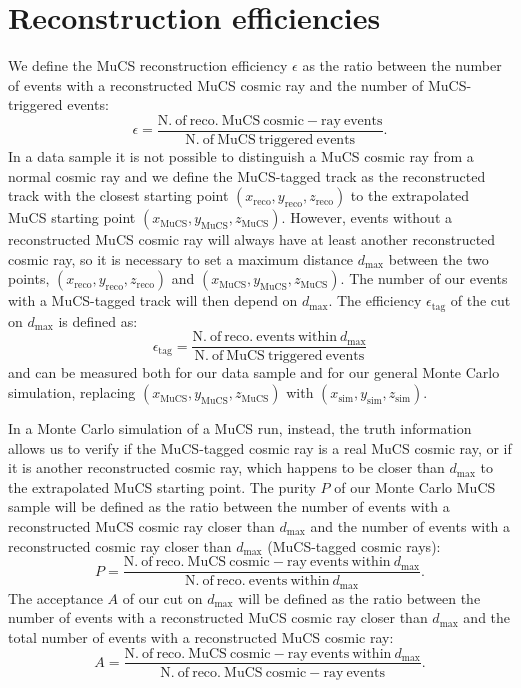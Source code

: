 \documentclass[a4paper]{scrartcl}
\begin{document}
\section{Reconstruction efficiencies}\label{sec:reco}

We define the MuCS reconstruction efficiency $\epsilon$ as the ratio between the number of events with a reconstructed MuCS cosmic ray and the number of MuCS-triggered events:
\begin{equation}\label{eq:eff}
  \epsilon = \frac{\mathrm{N.~of~reco.~MuCS~cosmic-ray~events}}{\mathrm{N.~of~MuCS~triggered~events}}.
\end{equation}
In a data sample it is not possible to distinguish a MuCS cosmic ray from a normal cosmic ray and we define the MuCS-tagged track as the reconstructed track with the closest starting point $(x_{\mathrm{reco}},y_{\mathrm{reco}},z_{\mathrm{reco}})$ to the extrapolated MuCS starting point $(x_{\mathrm{MuCS}},y_{\mathrm{MuCS}},z_{\mathrm{MuCS}})$. However, events without a reconstructed MuCS cosmic ray will always have at least another reconstructed cosmic ray, so it is necessary to set a maximum distance $d_{\mathrm{max}}$ between the two points, $(x_{\mathrm{reco}},y_{\mathrm{reco}},z_{\mathrm{reco}})$ and $(x_{\mathrm{MuCS}},y_{\mathrm{MuCS}},z_{\mathrm{MuCS}})$. The number of our events with a MuCS-tagged track will then depend on $d_{\mathrm{max}}$. The efficiency $\epsilon_{\mathrm{tag}}$ of the cut on $d_{\mathrm{max}}$ is defined as:
\begin{equation}
  \epsilon_{\mathrm{tag}}=\frac{\mathrm{N.~of~reco.~events~within~}d_{\mathrm{max}}}{\mathrm{N.~of~MuCS~triggered~events}}
\end{equation}
and can be measured both for our data sample and for our general Monte Carlo simulation, replacing $(x_{\mathrm{MuCS}},y_{\mathrm{MuCS}},z_{\mathrm{MuCS}})$ with $(x_{\mathrm{sim}},y_{\mathrm{sim}},z_{\mathrm{sim}})$.

In a Monte Carlo simulation of a MuCS run, instead, the truth information allows us to verify if the MuCS-tagged cosmic ray is a real MuCS cosmic ray, or if it is another reconstructed cosmic ray, which happens to be closer than $d_{\mathrm{max}}$ to the extrapolated MuCS starting point.
The purity $P$ of our Monte Carlo MuCS sample will be defined as the ratio between the number of events with a reconstructed MuCS cosmic ray closer than $d_{\mathrm{max}}$ and the number of events with a reconstructed cosmic ray closer than $d_{\mathrm{max}}$ (MuCS-tagged cosmic rays):
\begin{equation}
  P=\frac{\mathrm{N.~of~reco.~MuCS~cosmic-ray~events~within~}d_{\mathrm{max}}}{\mathrm{N.~of~reco.~events~within~}d_{\mathrm{max}}}.
\end{equation}
The acceptance $A$ of our cut on $d_{\mathrm{max}}$ will be defined as the ratio between the number of events with a reconstructed MuCS cosmic ray closer than $d_{\mathrm{max}}$ and the total number of events with a reconstructed MuCS cosmic ray:
\begin{equation}
  A=\frac{\mathrm{N.~of~reco.~MuCS~cosmic-ray~events~within~}d_{\mathrm{max}}}{\mathrm{N.~of~reco.~MuCS~cosmic-ray~events}}.
\end{equation}
\end{document}

